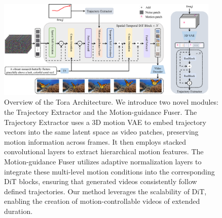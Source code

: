 \begin{figure}[!t]
    \centering
    \includegraphics[width=0.95\textwidth]{images/pipeline.pdf}
    \caption{
    Overview of the Tora Architecture. We introduce two novel modules: the Trajectory Extractor and the Motion-guidance Fuser. The Trajectory Extractor uses a 3D motion VAE to embed trajectory vectors into the same latent space as video patches, preserving motion information across frames. It then employs stacked convolutional layers to extract hierarchical motion features. The Motion-guidance Fuser utilizes adaptive normalization layers to integrate these multi-level motion conditions into the corresponding DiT blocks, ensuring that generated videos consistently follow defined trajectories. Our method leverages the scalability of DiT, enabling the creation of motion-controllable videos of extended duration.
    }
    \label{fig:3}   
\end{figure}


